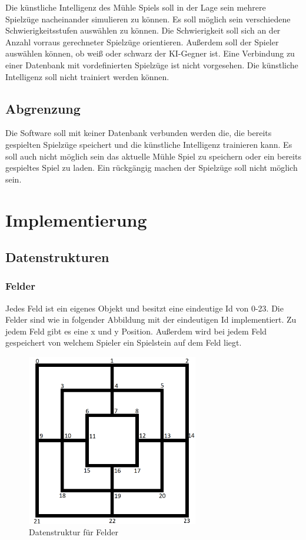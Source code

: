 \documentclass[oneside]{ausarbeitung}
\begin{document}
Die künstliche Intelligenz des Mühle Spiels soll in der Lage sein mehrere Spielzüge nacheinander simulieren zu können. Es soll möglich sein verschiedene Schwierigkeitsstufen auswählen zu können. Die Schwierigkeit soll sich an der Anzahl vorraus gerechneter Spielzüge orientieren. Außerdem soll der Spieler auswählen können, ob weiß oder schwarz der KI-Gegner ist. Eine Verbindung zu einer Datenbank mit vordefinierten Spielzüge ist nicht vorgesehen. Die künstliche Intelligenz soll nicht trainiert werden können.

\section{Abgrenzung}

Die Software soll mit keiner Datenbank verbunden werden die, die bereits gespielten Spielzüge speichert und die künstliche Intelligenz trainieren kann. Es soll auch nicht möglich sein das aktuelle Mühle Spiel zu speichern oder ein bereits gespieltes Spiel zu laden. Ein rückgängig machen der Spielzüge soll nicht möglich sein. 

\chapter{Implementierung}

\section{Datenstrukturen}

\subsection{Felder}

Jedes Feld ist ein eigenes Objekt und besitzt eine eindeutige Id von 0-23. Die Felder sind wie in folgender Abbildung mit der eindeutigen Id implementiert. Zu jedem Feld gibt es eine x und y Position. Außerdem wird bei jedem Feld gespeichert von welchem Spieler ein Spielstein auf dem Feld liegt.

\begin{figure}[ht]
	\centering
	\includegraphics[width=7.5cm,height=7.5cm]{images/gameboardFields.png}
	\caption[Datenstruktur für Felder]{Datenstruktur für Felder}
\end{figure}
\end{document}
